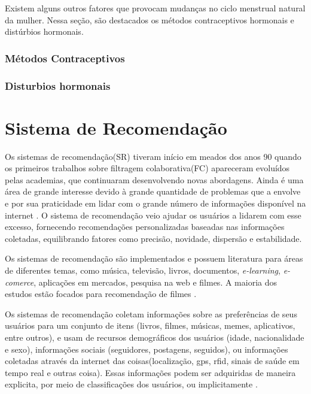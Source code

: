 Existem alguns outros fatores que provocam mudanças no ciclo menstrual 
natural da mulher. Nessa seção, são destacados os métodos 
contraceptivos hormonais e distúrbios hormonais.

\subsubsection{Métodos Contraceptivos}

\subsubsection{Disturbios hormonais}

\section{Sistema de Recomendação}
 
Os sistemas de recomendação(SR) tiveram início em meados dos anos 90 
quando os primeiros trabalhos sobre filtragem colaborativa(FC) 
apareceram \cite{felferning2008} evoluídos pelas academias, 
que continuaram desenvolvendo novas abordagens. 
Ainda é uma área de grande interesse devido à grande quantidade de 
problemas que a envolve e por sua praticidade em lidar com o grande 
número de informações disponível na internet \cite{adomavicius2005}. 
O sistema de recomendação veio ajudar os usuários a lidarem com esse 
excesso, fornecendo recomendações personalizadas baseadas nas informações 
coletadas, equilibrando fatores como precisão, novidade, dispersão e 
estabilidade\cite{bobadilla2013}.

Os sistemas de recomendação são implementados e possuem literatura 
para áreas de diferentes temas, como música, televisão, livros, 
documentos, \emph{e-learning}, \emph{e-comerce}, aplicações em mercados, 
pesquisa na web e filmes. A maioria dos estudos estão focados 
para recomendação de filmes \cite{bobadilla2013}.
 
Os sistemas de recomendação coletam informações sobre as preferências 
de seus usuários para um conjunto de itens (livros, filmes, músicas, 
memes, aplicativos, entre outros), e usam de recursos demográficos dos 
usuários (idade, nacionalidade e sexo), informações sociais 
(seguidores, postagens, seguidos), ou informações coletadas através da 
internet das coisas(localização, gps, rfid, sinais de saúde em tempo 
real e outras coisa). Essas informações podem ser adquiridas de maneira 
explicita, por meio de classificações dos usuários, ou implicitamente 
\cite{bobadilla2013}.


